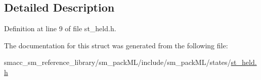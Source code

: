 \subsection{Detailed Description}


Definition at line 9 of file st\+\_\+held.\+h.



The documentation for this struct was generated from the following file\+:\begin{DoxyCompactItemize}
\item 
smacc\+\_\+sm\+\_\+reference\+\_\+library/sm\+\_\+pack\+M\+L/include/sm\+\_\+pack\+M\+L/states/\hyperlink{sm__packML_2include_2sm__packML_2states_2st__held_8h}{st\+\_\+held.\+h}\end{DoxyCompactItemize}
